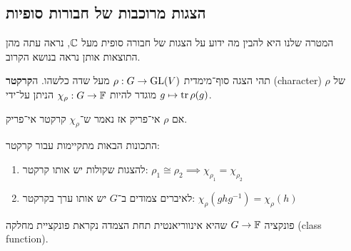 \subsection{הצגות מרוכבות של חבורות סופיות}
המטרה שלנו היא להבין מה ידוע על הצגות של חבורה סופית מעל $\mathbb{C}$, נראה עתה מהן התוצאות אותן נראה בנושא הקרוב.
\begin{definition}[קרקטר]
	תהי הצגה סוף־מימדית $\rho : G \to \operatorname{GL}(V)$ מעל שדה כלשהו.
	ה\textbf{קרקטר} (character) של $\rho$ מוגדר להיות $\chi_{\rho} : G \to \mathbb{F}$ הניתן על־ידי $g \mapsto \operatorname{tr} \rho(g)$.
\end{definition}
\begin{definition}
	אם $\rho$ אי־פריק אז נאמר ש־$\chi_{\rho}$ קרקטר אי־פריק.
\end{definition}
\begin{proposition}
	התכונות הבאות מתקיימות עבור קרקטר:
	\begin{enumerate}
		\item להצגות שקולות יש אותו קרקטר: $\rho_1 \cong \rho_2 \implies \chi_{\rho_1} = \chi_{\rho_2}$
		\item לאיברים צמודים ב־$G$ יש אותו ערך בקרקטר: $\chi_{\rho}(g h g^{-1}) = \chi_{\rho}(h)$
	\end{enumerate}
\end{proposition}
פונקציה $G \to \mathbb{F}$ שהיא אינווריאנטית תחת הצמדה נקראת פונקציית מחלקה (class function).

